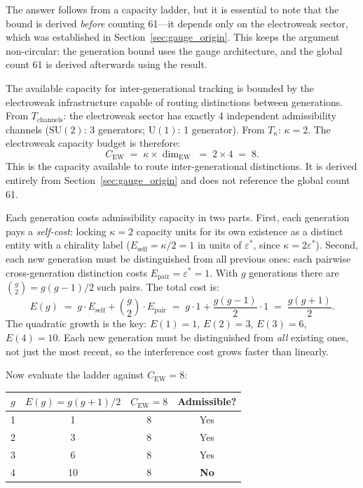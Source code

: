 \documentclass[11pt]{article}
\newcommand{\SU}{\mathrm{SU}}
\newcommand{\U}{\mathrm{U}}
\begin{document}
The answer follows from a capacity ladder, but it is essential to note that the bound is derived \emph{before} counting 61---it depends only on the electroweak sector, which was established in Section~\ref{sec:gauge_origin}.  This keeps the argument non-circular: the generation bound uses the gauge architecture, and the global count 61 is derived afterwards using the result.

The available capacity for inter-generational tracking is bounded by the electroweak infrastructure capable of routing distinctions between generations.  From $T_{\mathrm{channels}}$: the electroweak sector has exactly 4 independent admissibility channels ($\SU(2)$: 3 generators; $\U(1)$: 1 generator).  From $T_\kappa$: $\kappa = 2$.  The electroweak capacity budget is therefore:
\begin{equation}
C_{\mathrm{EW}} \;=\; \kappa \times \dim_{\mathrm{EW}} \;=\; 2 \times 4 \;=\; 8.
\label{eq:c_ew}
\end{equation}
This is the capacity available to route inter-generational distinctions.  It is derived entirely from Section~\ref{sec:gauge_origin} and does not reference the global count 61.

Each generation costs admissibility capacity in two parts.  First, each generation pays a \emph{self-cost}: locking $\kappa = 2$ capacity units for its own existence as a distinct entity with a chirality label ($E_{\mathrm{self}} = \kappa/2 = 1$ in units of $\varepsilon^*$, since $\kappa = 2\varepsilon^*$).  Second, each new generation must be distinguished from all previous ones: each pairwise cross-generation distinction costs $E_{\mathrm{pair}} = \varepsilon^* = 1$.  With $g$ generations there are $\binom{g}{2} = g(g-1)/2$ such pairs.  The total cost is:
\begin{equation}
E(g) \;=\; g \cdot E_{\mathrm{self}} + \binom{g}{2} \cdot E_{\mathrm{pair}} \;=\; g \cdot 1 + \frac{g(g-1)}{2} \cdot 1 \;=\; \frac{g(g+1)}{2}.
\label{eq:capacity_ladder}
\end{equation}
The quadratic growth is the key: $E(1) = 1$, $E(2) = 3$, $E(3) = 6$, $E(4) = 10$.  Each new generation must be distinguished from \emph{all} existing ones, not just the most recent, so the interference cost grows faster than linearly.

Now evaluate the ladder against $C_{\mathrm{EW}} = 8$:

\begin{center}
\begin{tabular}{cccc}
\toprule
$g$ & $E(g) = g(g+1)/2$ & $C_{\mathrm{EW}} = 8$ & Admissible? \\
\midrule
1 & 1 & 8 & Yes \\
2 & 3 & 8 & Yes \\
3 & 6 & 8 & Yes \\
4 & 10 & 8 & \textbf{No} \\
\bottomrule
\end{tabular}
\end{center}
\end{document}
